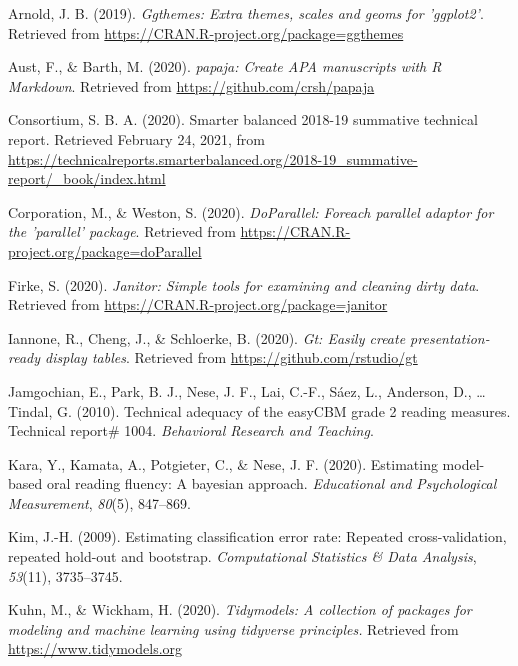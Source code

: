 \documentclass[
  english,
  man, fleqn, noextraspace]{apa6}
\begin{document}
\leavevmode\hypertarget{ref-ggthemes}{}%
Arnold, J. B. (2019). \emph{Ggthemes: Extra themes, scales and geoms for 'ggplot2'}. Retrieved from \url{https://CRAN.R-project.org/package=ggthemes}

\leavevmode\hypertarget{ref-papaja}{}%
Aust, F., \& Barth, M. (2020). \emph{papaja: Create APA manuscripts with R Markdown}. Retrieved from \url{https://github.com/crsh/papaja}

\leavevmode\hypertarget{ref-sbac}{}%
Consortium, S. B. A. (2020). Smarter balanced 2018-19 summative technical report. Retrieved February 24, 2021, from \url{https://technicalreports.smarterbalanced.org/2018-19_summative-report/_book/index.html}

\leavevmode\hypertarget{ref-doParallel}{}%
Corporation, M., \& Weston, S. (2020). \emph{DoParallel: Foreach parallel adaptor for the 'parallel' package}. Retrieved from \url{https://CRAN.R-project.org/package=doParallel}

\leavevmode\hypertarget{ref-janitor}{}%
Firke, S. (2020). \emph{Janitor: Simple tools for examining and cleaning dirty data}. Retrieved from \url{https://CRAN.R-project.org/package=janitor}

\leavevmode\hypertarget{ref-gt}{}%
Iannone, R., Cheng, J., \& Schloerke, B. (2020). \emph{Gt: Easily create presentation-ready display tables}. Retrieved from \url{https://github.com/rstudio/gt}

\leavevmode\hypertarget{ref-jamgochian2010tech}{}%
Jamgochian, E., Park, B. J., Nese, J. F., Lai, C.-F., Sáez, L., Anderson, D., \ldots{} Tindal, G. (2010). Technical adequacy of the easyCBM grade 2 reading measures. Technical report\# 1004. \emph{Behavioral Research and Teaching}.

\leavevmode\hypertarget{ref-kara2020}{}%
Kara, Y., Kamata, A., Potgieter, C., \& Nese, J. F. (2020). Estimating model-based oral reading fluency: A bayesian approach. \emph{Educational and Psychological Measurement}, \emph{80}(5), 847--869.

\leavevmode\hypertarget{ref-kim2009}{}%
Kim, J.-H. (2009). Estimating classification error rate: Repeated cross-validation, repeated hold-out and bootstrap. \emph{Computational Statistics \& Data Analysis}, \emph{53}(11), 3735--3745.

\leavevmode\hypertarget{ref-tidymodels}{}%
Kuhn, M., \& Wickham, H. (2020). \emph{Tidymodels: A collection of packages for modeling and machine learning using tidyverse principles.} Retrieved from \url{https://www.tidymodels.org}
\end{document}
